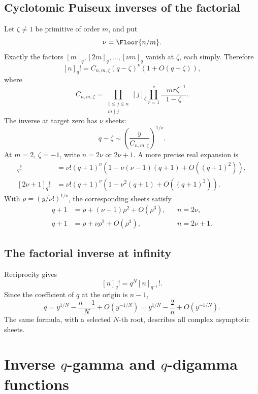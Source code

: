\documentclass[11pt,letterpaper,oneside,openany]{book}
\theoremstyle{definition}
\theoremstyle{remark}
\begin{document}
\section{Cyclotomic Puiseux inverses of the factorial}
Let \(\zeta\ne1\) be primitive of order \(m\), and put
\[
 \nu=\Floor{n/m}.
\]
Exactly the factors \([m]_q,[2m]_q,\ldots,[\nu m]_q\) vanish at \(\zeta\), each
simply.  Therefore
\begin{equation}\label{eq:qfactorial-root-unity}
 [n]_q!=C_{n,m,\zeta}(q-\zeta)^\nu(1+O(q-\zeta)),
\end{equation}
where
\[
 C_{n,m,\zeta}=
 \prod_{\substack{1\le j\le n\\m\nmid j}}[j]_\zeta
 \prod_{r=1}^{\nu}\frac{-mr\zeta^{-1}}{1-\zeta}.
\]
The inverse at target zero has \(\nu\) sheets:
\[
 q-\zeta\sim\left(\frac{y}{C_{n,m,\zeta}}\right)^{1/\nu}.
\]
At \(m=2\), \(\zeta=-1\), write \(n=2\nu\) or \(2\nu+1\).  A more precise
real expansion is
\begin{align}
 [2\nu]_q!&=\nu!(q+1)^\nu
 \left(1-\nu(\nu-1)(q+1)+O((q+1)^2)\right),\\
 [2\nu+1]_q!&=\nu!(q+1)^\nu
 \left(1-\nu^2(q+1)+O((q+1)^2)\right).
\end{align}
With \(\rho=(y/\nu!)^{1/\nu}\), the corresponding sheets satisfy
\begin{align}
 q+1&=\rho+(\nu-1)\rho^2+O(\rho^3),&&n=2\nu,\\
 q+1&=\rho+\nu\rho^2+O(\rho^3),&&n=2\nu+1.
 \label{eq:qfactorial-minusone-inverse}
\end{align}

\section{The factorial inverse at infinity}
Reciprocity gives
\[
 [n]_q!=q^N[n]_{q^{-1}}!.
\]
Since the coefficient of \(q\) at the origin is \(n-1\),
\begin{equation}\label{eq:qfactorial-infinity-inverse}
 q=y^{1/N}-\frac{n-1}{N}+O(y^{-1/N})
 =y^{1/N}-\frac2n+O(y^{-1/N}).
\end{equation}
The same formula, with a selected \(N\)-th root, describes all complex
asymptotic sheets.

\chapter{Inverse \texorpdfstring{\(q\)}{q}-gamma and \texorpdfstring{\(q\)}{q}-digamma functions}
\end{document}
